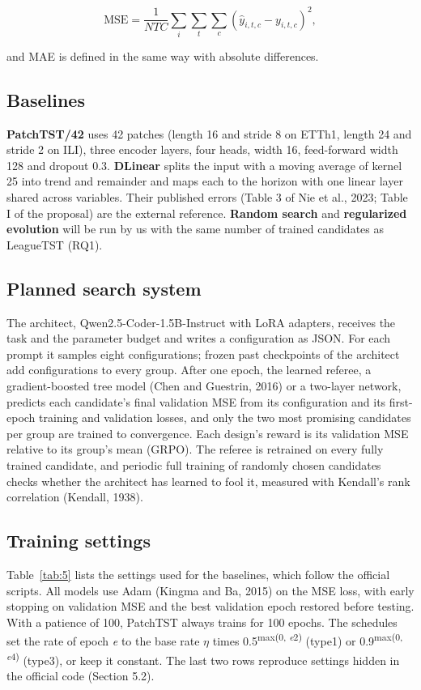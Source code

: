 \documentclass[11pt,letterpaper]{article}
\begin{document}
\[\mathrm{MSE} = \frac{1}{NTC}\sum_{i}\sum_{t}\sum_{c}\left(\widehat{y}_{i,t,c} - y_{i,t,c}\right)^{2},\]

and MAE is defined in the same way with absolute differences.

\subsection{Baselines}
\textbf{PatchTST/42} uses 42 patches (length 16 and stride 8 on ETTh1, length 24 and stride 2 on ILI), three encoder layers, four heads, width 16, feed-forward width 128 and dropout 0.3. \textbf{DLinear} splits the input with a moving average of kernel 25 into trend and remainder and maps each to the horizon with one linear layer shared across variables. Their published errors (Table 3 of Nie et al., 2023; Table I of the proposal) are the external reference. \textbf{Random search} and \textbf{regularized evolution} will be run by us with the same number of trained candidates as LeagueTST (RQ1).

\subsection{Planned search system}
The architect, Qwen2.5-Coder-1.5B-Instruct with LoRA adapters, receives the task and the parameter budget and writes a configuration as JSON. For each prompt it samples eight configurations; frozen past checkpoints of the architect add configurations to every group. After one epoch, the learned referee, a gradient-boosted tree model (Chen and Guestrin, 2016) or a two-layer network, predicts each candidate's final validation MSE from its configuration and its first-epoch training and validation losses, and only the two most promising candidates per group are trained to convergence. Each design's reward is its validation MSE relative to its group's mean (GRPO). The referee is retrained on every fully trained candidate, and periodic full training of randomly chosen candidates checks whether the architect has learned to fool it, measured with Kendall's rank correlation (Kendall, 1938).

\subsection{Training settings}
Table~\ref{tab:5} lists the settings used for the baselines, which follow the official scripts. All models use Adam (Kingma and Ba, 2015) on the MSE loss, with early stopping on validation MSE and the best validation epoch restored before testing. With a patience of 100, PatchTST always trains for 100 epochs. The schedules set the rate of epoch \textit{e} to the base rate \textit{$\eta$} times 0.5\textsuperscript{max(0, \textit{e}\textminus{}2)} (type1) or 0.9\textsuperscript{max(0, \textit{e}\textminus{}4)} (type3), or keep it constant. The last two rows reproduce settings hidden in the official code (Section 5.2).
\end{document}
